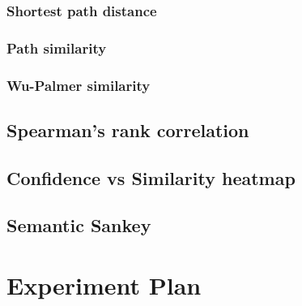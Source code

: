 \subsubsection{Shortest path distance}
\subsubsection{Path similarity}
\subsubsection{Wu-Palmer similarity}

\subsection{Spearman's rank correlation}
\subsection{Confidence vs Similarity heatmap}
\subsection{Semantic Sankey}

\section{Experiment Plan}